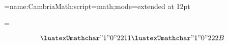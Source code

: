 

\font\cambria={name:CambriaMath:script=math;mode=extended} at 12pt

=\cambria

\luatexUmathoperatorsize\displaystyle=20pt

$$ \luatexUmathchar "1 "0 "2211 \luatexUmathchar "1 "0 "222B $$

\bye

